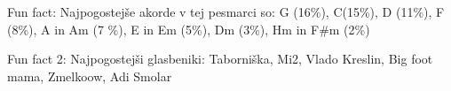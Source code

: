 \begin{akordi}

    Fun fact:
    Najpogostejše akorde v tej pesmarci so:
    G (16\%), C(15\%), D (11\%), F (8\%), A in Am (7 \%), E in Em (5\%), Dm (3\%), Hm in F#m (2\%)

    Fun fact 2:
    Najpogostejši glasbeniki: Taborniška, Mi2, Vlado Kreslin, Big foot mama, Zmelkoow, Adi Smolar


\end{akordi}





